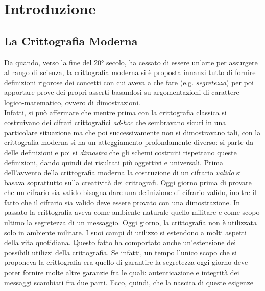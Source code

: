 \documentclass[a4paper,openright,twoside,12pt]{report}
\author{Gian Pietro Farina}
\begin{document}
\chapter{Introduzione}
\section{La Crittografia Moderna}
Da quando, verso la fine del 20° secolo, ha cessato di essere un'arte per assurgere al rango di scienza, la crittografia moderna
si \`e proposta innanzi tutto di fornire definizioni rigorose dei concetti con cui aveva a che fare (e.g. \emph{segretezza}) per poi apportare prove dei propri asserti basandosi 
su argomentazioni di carattere logico-matematico, ovvero di dimostrazioni. \\ Infatti, si pu\`o affermare che mentre prima
con la crittografia classica si costruivano dei cifrari crittografici \emph{ad-hoc} che sembravano sicuri in una particolare situazione ma che poi successivamente
non si dimostravano tali, con la crittografia moderna si ha un atteggiamento profondamente diverso: si parte da delle definizioni e poi
si \emph{dimostra} che gli schemi costruiti rispettano queste definizioni, dando quindi dei risultati pi\`u oggettivi e universali.
Prima dell'avvento della crittografia moderna la costruzione di un cifrario \emph{valido} si basava soprattutto sulla creativit\`a 
dei crittografi. Oggi giorno prima di provare che un cifrario sia valido bisogna dare una definizione di cifrario valido, inoltre il fatto
che il cifrario sia valido deve essere provato con una dimostrazione.
In passato la crittografia aveva come ambiente naturale quello militare e come scopo ultimo la segretezza di un messaggio.
Oggi giorno, la crittografia non \`e utilizzata solo in ambiente militare. I suoi campi di utilizzo si estendono a molti aspetti della vita quotidiana.
Questo fatto ha comportato anche un'estensione dei possibili utilizzi della crittografia. Se infatti, un tempo l'unico scopo che si proponeva la crittografia era quello di garantire
la segretezza oggi giorno deve poter fornire molte altre garanzie fra le quali: autenticazione e integrit\`a dei messaggi scambiati fra due parti. Ecco, quindi, che la nascita di queste esigenze
\end{document}

